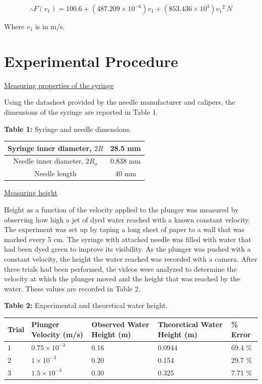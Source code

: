 \documentclass{article}
\begin{document}
\[ \therefore F(v_{1}) = 100.6 + (487.209 \times 10^{-6}) v_{1} + (853.436 \times 10^{3}) {v_{1}}^2 \ N \]

Where $v_{1}$ is in m/s.
\\

\section{Experimental Procedure}

\underline{Measuring properties of the syringe}

Using the datasheet provided by the needle manufacturer and calipers, the dimensions of the syringe are reported in Table 1.

\begin{center}\textbf{Table 1:} Syringe and needle dimensions. \end{center}
\begin{center}
\begin{tabular}{| c | c |}
\hline
Syringe inner diameter, $2R$ & 28.5 mm \\ 
\hline
Needle inner diameter, $2R_{o}$ & 0.838 mm \\  
\hline
Needle length & 40 mm \\  
\hline
\end{tabular}
\end{center}

\noindent\underline{Measuring height}

Height as a function of the velocity applied to the plunger was measured by observing how high a jet of dyed water reached with a known constant velocity.
The experiment was set up by taping a long sheet of paper to a wall that was marked every 5 cm.
The syringe with attached needle was filled with water that had been dyed green to improve its visibility.
As the plunger was pushed with a constant velocity, the height the water reached was recorded with a camera.
After three trials had been performed, the videos were analyzed to determine the velocity at which the plunger moved and the height that was reached by the water.
These values are recorded in Table 2.

\begin{center}\textbf{Table 2:} Experimental and theoretical water height. \end{center}
\begin{center}
\begin{tabular}{| p{1cm} | p{3.6cm} | p{3.6cm} | p{3.6cm} | p{2cm} |}
\hline
\textbf{Trial} & \textbf{Plunger Velocity (m/s)} & \textbf{Observed Water Height (m)} & \textbf{Theoretical Water Height (m)} & \textbf{\% Error} \\
\hline
1 & $0.75 \times 10^{-3}$ & 0.16 & 0.0944 & 69.4 \% \\  
\hline
2 & $1 \times 10^{-3}$ & 0.20 & 0.154 & 29.7 \% \\
\hline
3 & $1.5 \times 10^{-3}$ & 0.30 & 0.325 & 7.71 \% \\  
\hline
\end{tabular}
\end{center}
\end{document}
